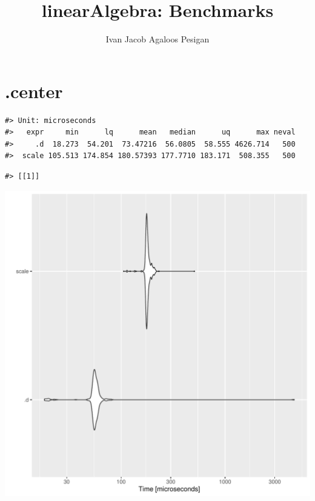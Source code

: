 \documentclass{article}\usepackage[]{graphicx}\usepackage[]{color}
\title{linearAlgebra: Benchmarks}
\author{Ivan Jacob Agaloos Pesigan}
\date{}
\makeatletter
\newenvironment{kframe}{%
 \def\at@end@of@kframe{}%
 \ifinner\ifhmode%
  \def\at@end@of@kframe{\end{minipage}}%
  \begin{minipage}{\columnwidth}%
 \fi\fi%
 \def\FrameCommand##1{\hskip\@totalleftmargin \hskip-\fboxsep
 \colorbox{shadecolor}{##1}\hskip-\fboxsep
     \hskip-\linewidth \hskip-\@totalleftmargin \hskip\columnwidth}%
 \MakeFramed {\advance\hsize-\width
   \@totalleftmargin\z@ \linewidth\hsize
   \@setminipage}}%
 {\par\unskip\endMakeFramed%
 \at@end@of@kframe}
\newenvironment{knitrout}{}{} %
\makeatother
\begin{document}
\maketitle





\section{.center}



\begin{knitrout}
\color{fgcolor}\begin{kframe}
\begin{verbatim}
#> Unit: microseconds
#>   expr     min      lq      mean   median      uq      max neval
#>     .d  18.273  54.201  73.47216  56.0805  58.555 4626.714   500
#>  scale 105.513 174.854 180.57393 177.7710 183.171  508.355   500
\end{verbatim}


{\ttfamily\noindent\itshape\color{messagecolor}{\#> Coordinate system already present. Adding new coordinate system, which will replace the existing one.}}\begin{verbatim}
#> [[1]]
\end{verbatim}
\end{kframe}
\includegraphics[width=1\linewidth]{man/figures/latex-test-benchmark-linearAlgebra-d-dot-1} 

\end{knitrout}
\end{document}
